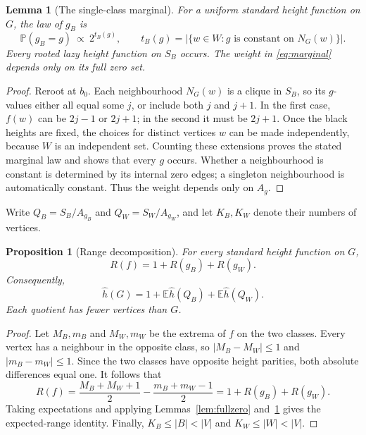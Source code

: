 \documentclass[11pt,reqno]{amsart}
\newtheorem{proposition}[theorem]{Proposition}
\newtheorem{lemma}[theorem]{Lemma}
\theoremstyle{remark}
\numberwithin{equation}{section}
\newcommand{\E}{\mathbb E}
\newcommand{\PP}{\mathbb P}
\begin{document}
\begin{lemma}[The single-class marginal]\label{lem:marginal}
For a uniform standard height function on $G$, the law of $g_B$ is
\begin{equation}\label{eq:marginal}
 \PP(g_B=g)\ \propto\ 2^{t_B(g)},\qquad
 t_B(g)=|\{w\in W:g\text{ is constant on }N_G(w)\}|.
\end{equation}
Every rooted lazy height function on $S_B$ occurs. The weight in
\eqref{eq:marginal} depends only on its full zero set.
\end{lemma}

\begin{proof}
Reroot at $b_0$. Each neighbourhood $N_G(w)$ is a clique in $S_B$, so its
$g$-values either all equal some $j$, or include both $j$ and $j+1$.
In the first case, $f(w)$ can be $2j-1$ or $2j+1$; in the second it must
be $2j+1$. Once the black heights are fixed, the choices for distinct
vertices $w$ can be made independently, because $W$ is an independent
set. Counting these extensions proves the stated marginal law and
shows that every $g$ occurs. Whether a neighbourhood is constant is
determined by its internal zero edges; a singleton neighbourhood is
automatically constant. Thus the weight depends only on $A_g$.
\end{proof}

Write $Q_B=S_B/A_{g_B}$ and $Q_W=S_W/A_{g_W}$, and let $K_B,K_W$
denote their numbers of vertices.

\begin{proposition}[Range decomposition]\label{prop:decimation}
For every standard height function on $G$,
\begin{equation}\label{eq:range-decomposition}
 R(f)=1+R(g_B)+R(g_W).
\end{equation}
Consequently,
\begin{equation}\label{eq:decimation}
 \widehat h(G)=1+\E\widehat h(Q_B)+\E\widehat h(Q_W).
\end{equation}
Each quotient has fewer vertices than $G$.
\end{proposition}

\begin{proof}
Let $M_B,m_B$ and $M_W,m_W$ be the extrema of $f$ on the two classes.
Every vertex has a neighbour in the opposite class, so
$|M_B-M_W|\le1$ and $|m_B-m_W|\le1$. Since the two classes have opposite
height parities, both absolute differences equal one. It follows that
\[
 R(f)=\frac{M_B+M_W+1}{2}-\frac{m_B+m_W-1}{2}
      =1+R(g_B)+R(g_W).
\]
Taking expectations and applying Lemmas~\ref{lem:fullzero}
and~\ref{lem:marginal} gives the expected-range identity.
Finally, $K_B\le |B|<|V|$ and $K_W\le |W|<|V|$.
\end{proof}
\end{document}
